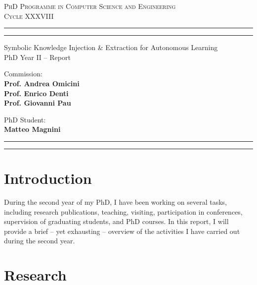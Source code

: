 \documentclass[11pt]{article}
\begin{document}
\sloppy
\begin{center}
	{{
		\Large{
			\textsc{PhD Programme in Computer Science and Engineering \\ 
			\vspace{4mm}
			Cycle XXXVIII}
			}
	}} 
	\rule[0.1cm]{\textwidth}{0.1mm}
	\rule[0.4cm]{\textwidth}{0.6mm}
\end{center}

\begin{center}
	{\LARGE{Symbolic Knowledge Injection \& Extraction for Autonomous Learning}} \\
	\vspace{4mm}
	{\large{PhD Year II -- Report}} 
	\vspace{4mm}
\end{center}
\vspace{8mm}
\par
\noindent
\begin{minipage}[t]{0.47\textwidth}

{\large{Commission: \\\bf
Prof. Andrea Omicini \\
Prof. Enrico Denti \\
Prof. Giovanni Pau}
}
\end{minipage}
\hfill
\begin{minipage}[t]{0.47\textwidth}
	\raggedleft
	{
		\large{PhD Student: \\\bf Matteo Magnini}
	}
\end{minipage}
\vspace{10mm}

{
	\raggedright
	\rule[0.1cm]{\textwidth}{0.6mm}
	\rule[0.5cm]{\textwidth}{0.1mm}
}

\newcommand{\rev}[1]{{
	#1
	}}
\section{Introduction}
During the second year of my PhD, I have been working on several tasks, including research publications, teaching, visiting, participation in conferences, supervision of graduating students, and PhD courses.
%
In this report, I will provide a brief -- yet exhausting -- overview of the activities I have carried out during the second year.


\section{Research}

%
\end{document}
